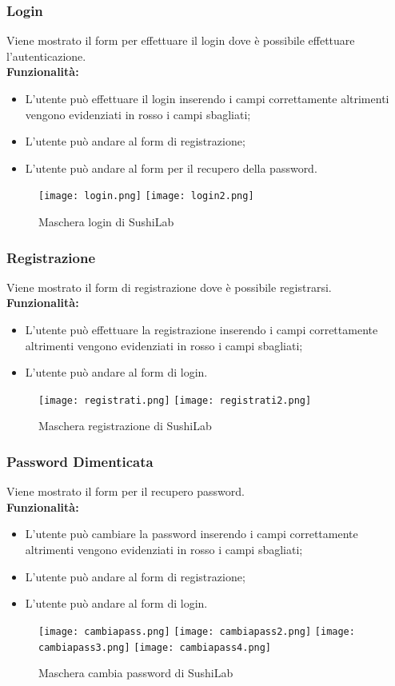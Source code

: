 \subsubsection{Login}
Viene mostrato il form per effettuare il login dove è possibile effettuare l'autenticazione.\\
\textbf{Funzionalità:}
\begin{itemize}
    \item L'utente può effettuare il login inserendo i campi correttamente altrimenti vengono evidenziati in rosso i campi sbagliati;
    \item L'utente può andare al form di registrazione;
    \item L'utente può andare al form per il recupero della password.
\end{itemize}
\begin{figure}[H]
    \centering
    \texttt{[image: login.png]}
    \texttt{[image: login2.png]}
    \caption{Maschera login di SushiLab}
\end{figure}
\pagebreak

\subsubsection{Registrazione}
Viene mostrato il form di registrazione dove è possibile registrarsi.\\
\textbf{Funzionalità:}
\begin{itemize}
    \item L'utente può effettuare la registrazione inserendo i campi correttamente altrimenti vengono evidenziati in rosso i campi sbagliati;
    \item L'utente può andare al form di login.
\end{itemize}
\begin{figure}[H]
    \centering
    \texttt{[image: registrati.png]}
    \texttt{[image: registrati2.png]}
    \caption{Maschera registrazione di SushiLab}
\end{figure}
\pagebreak

\subsubsection{Password Dimenticata}
Viene mostrato il form per il recupero password.\\
\textbf{Funzionalità:}
\begin{itemize}
    \setlength\itemsep{.1em}
    \item L'utente può cambiare la password inserendo i campi correttamente altrimenti vengono evidenziati in rosso i campi sbagliati;
    \item L'utente può andare al form di registrazione;
    \item L'utente può andare al form di login.
\end{itemize}
\begin{figure}[H]
    \centering
    \texttt{[image: cambiapass.png]}
    \texttt{[image: cambiapass2.png]}
    \texttt{[image: cambiapass3.png]}
    \texttt{[image: cambiapass4.png]}
    \caption{Maschera cambia password di SushiLab}
\end{figure}
\pagebreak

